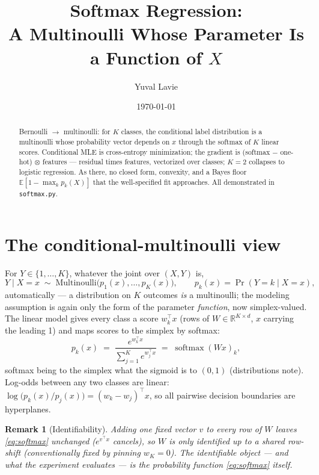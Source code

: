 \documentclass[11pt]{article}
\title{Softmax Regression:\\
A Multinoulli Whose Parameter Is a Function of $X$}
\author{Yuval Lavie}
\date{\today}
\newtheorem{remark}{Remark}
\begin{document}
\maketitle

\begin{abstract}
Bernoulli $\to$ multinoulli: for $K$ classes, the conditional label
distribution is a multinoulli whose probability vector depends on $x$
through the softmax of $K$ linear scores. Conditional MLE is
cross-entropy minimization; the gradient is (softmax $-$ one-hot)
$\otimes$ features --- residual times features, vectorized over classes;
$K = 2$ collapses to logistic regression. As there, no closed form,
convexity, and a Bayes floor $\mathbb{E}[1 - \max_k p_k(X)]$ that the
well-specified fit approaches. All demonstrated in \texttt{softmax.py}.
\end{abstract}

\section{The conditional-multinoulli view}

For $Y \in \{1,\dots,K\}$, whatever the joint over $(X, Y)$ is,
\begin{equation}
  Y \mid X = x \;\sim\; \mathrm{Multinoulli}\bigl(p_1(x),\dots,p_K(x)\bigr),
  \qquad
  p_k(x) = \Pr(Y = k \mid X = x),
  \label{eq:condmulti}
\end{equation}
automatically --- a distribution on $K$ outcomes \emph{is} a multinoulli;
the modeling assumption is again only the form of the parameter
\emph{function}, now simplex-valued. The linear model gives every class a
score $w_k^\top x$ (rows of $W \in \mathbb{R}^{K\times d}$, $x$ carrying
the leading 1) and maps scores to the simplex by softmax:
\begin{equation}
  p_k(x) \;=\; \frac{e^{w_k^\top x}}{\sum_{j=1}^{K} e^{w_j^\top x}}
  \;=\; \operatorname{softmax}(Wx)_k ,
  \label{eq:softmax}
\end{equation}
softmax being to the simplex what the sigmoid is to $(0,1)$
(distributions note). Log-odds between any two classes are linear:
$\log\bigl(p_k(x)/p_j(x)\bigr) = (w_k - w_j)^\top x$, so all pairwise
decision boundaries are hyperplanes.

\begin{remark}[Identifiability]
Adding one fixed vector $v$ to every row of $W$ leaves
\eqref{eq:softmax} unchanged ($e^{v^\top x}$ cancels), so $W$ is only
identified up to a shared row-shift (conventionally fixed by pinning
$w_K = 0$). The identifiable object --- and what the experiment
evaluates --- is the probability function \eqref{eq:softmax} itself.
\end{remark}
\end{document}
